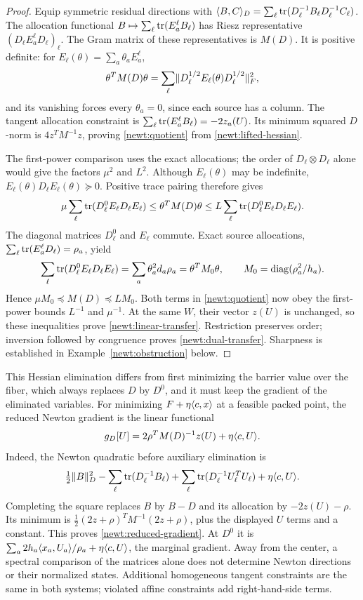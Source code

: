 \begin{proof}
Equip symmetric residual directions with
$\langle B,C\rangle_D=\sum_\ell\operatorname{tr}(D_\ell^{-1}B_\ell D_\ell^{-1}C_\ell)$.
The allocation functional $B\mapsto\sum_\ell\operatorname{tr}(E_a^\ell B_\ell)$
has Riesz representative $(D_\ell E_a^\ell D_\ell)_\ell$.  The Gram
matrix of these representatives is $M(D)$.  It is positive definite:
for $E_\ell(\theta)=\sum_a\theta_aE_a^\ell$,
\[
 \theta^TM(D)\theta=\sum_\ell
   \lVert D_\ell^{1/2}E_\ell(\theta)D_\ell^{1/2}\rVert_F^2,
\]
and its vanishing forces every $\theta_a=0$, since each source has a
column.  The tangent allocation constraint is
$\sum_\ell\operatorname{tr}(E_a^\ell B_\ell)=-2z_a(U)$.
Its minimum squared $D$-norm is $4z^TM^{-1}z$, proving
\eqref{newt:quotient} from \eqref{newt:lifted-hessian}.

The first-power comparison uses the exact allocations; the order of
$D_\ell\otimes D_\ell$ alone would give the factors $\mu^2$ and $L^2$.
Although $E_\ell(\theta)$ may be indefinite,
$E_\ell(\theta)D_\ell E_\ell(\theta)\succeq0$.  Positive trace pairing
therefore gives
\[
 \mu\sum_\ell\operatorname{tr}(D_\ell^0 E_\ell D_\ell E_\ell)
 \leq\theta^TM(D)\theta
 \leq L\sum_\ell\operatorname{tr}(D_\ell^0 E_\ell D_\ell E_\ell).
\]
The diagonal matrices $D_\ell^0$ and $E_\ell$ commute.  Exact source
allocations, $\sum_\ell\operatorname{tr}(E_a^\ell D_\ell)=\rho_a$, yield
\begin{equation}\label{newt:allocation-identity}
 \sum_\ell\operatorname{tr}(D_\ell^0 E_\ell D_\ell E_\ell)
 =\sum_a\theta_a^2d_a\rho_a
 =\theta^TM_0\theta,
 \qquad M_0=\operatorname{diag}(\rho_a^2/h_a).
\end{equation}
Hence $\mu M_0\preceq M(D)\preceq LM_0$.
Both terms in \eqref{newt:quotient} now obey the first-power bounds
$L^{-1}$ and $\mu^{-1}$.  At the same $W$, their vector $z(U)$ is
unchanged, so these inequalities prove \eqref{newt:linear-transfer}.
Restriction preserves order; inversion followed by congruence proves
\eqref{newt:dual-transfer}.  Sharpness is established in
Example~\ref{newt:obstruction} below.
\end{proof}

This Hessian elimination differs from first minimizing the barrier
value over the fiber, which always replaces $D$ by $D^0$, and it must
keep the gradient of the eliminated variables.
For minimizing $F+\eta\langle c,x\rangle$ at a feasible packed point, the reduced
Newton gradient is the linear functional
\begin{equation}\label{newt:reduced-gradient}
 g_D[U]=2\rho^TM(D)^{-1}z(U)+\eta\langle c,U\rangle.
\end{equation}
Indeed, the Newton quadratic before auxiliary elimination is
\[
 \tfrac12\lVert B\rVert_D^2-\sum_\ell\operatorname{tr}(D_\ell^{-1}B_\ell)
  +\sum_\ell\operatorname{tr}(D_\ell^{-1}U_\ell^TU_\ell)+\eta\langle c,U\rangle.
\]
Completing the square replaces $B$ by $B-D$ and its allocation by
$-2z(U)-\rho$.  Its minimum is
$\tfrac12(2z+\rho)^TM^{-1}(2z+\rho)$, plus the displayed $U$ terms
and a constant.  This proves \eqref{newt:reduced-gradient}.  At $D^0$
it is $\sum_a2h_a\langle x_a,U_a\rangle/\rho_a+\eta\langle c,U\rangle$,
the marginal gradient.  Away from the center, a spectral comparison of the
matrices alone does not determine Newton directions or their normalized
states.  Additional homogeneous tangent constraints are the same in both
systems; violated affine constraints add right-hand-side terms.

